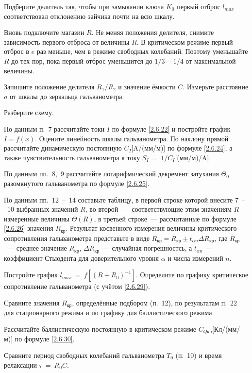 \begin{lab:task}
Подберите делитель так, чтобы при замыкании ключа
$K_0$ первый отброс $l_{max}$ соответствовал отклонению
зайчика почти на всю шкалу.

	\item Вновь подключите магазин $R$. Не меняя положения делителя,
снимите зависимость первого отброса от величины $R$. В критическом
режиме первый отброс в $e$ раз меньше, чем в режиме свободных
колебаний. Поэтому уменьшайте $R$ до тех пор, пока первый отброс
уменьшится до $1/3-1/4$ от максимальной величины.

	\item Запишите положение делителя
$R_1/R_2$ и значение ёмкости
$C$. Измерьте расстояние $a$ от шкалы до зеркальца
гальванометра.

	\item Разберите схему.


	\item По данным п.~7 рассчитайте токи $I$ по формуле \eqref{2.6.22} и постройте
график $I=f(x)$. Оцените линейность шкалы гальванометра. По наклону
прямой рассчитайте динамическую постоянную $C_I$[A/(мм/м)] по формуле
\eqref{2.6.24}, а также чувствительность гальванометра к току $S_I~=~1/C_I$[(мм/м)/A].

	\item По данным пп.~8,~9 рассчитайте логарифмический декремент затухания $\Theta_0$
разомкнутого гальванометра по формуле \eqref{2.6.25}.

	\item По данным пп.~12~--~14 составьте таблицу, в первой строке которой
внесите 7~--~10 выбранных значений $R$, во второй~---~соответствующие
этим значениям $R$ измеренные величины $\Theta(R)$, в третьей строке~--- 
рассчитанные по формуле \eqref{2.6.26} значения $R_{\text{кр}}$. Результат косвенного 
измерения величины критического сопротивления гальванометра представьте в 
виде $R_{\text{кр}}=\overline R_{\text{кр}}\pm t_{\alpha n}\Delta R_{\text{кр}}$,
где $\overline R_{\text{кр}}$~--- среднее значение $R_{\text{кр}}$, 
$\Delta R_{\text{кр}}$~--- случайная погрешностсь, а $t_{\alpha n}$~--- коэффициент
Стьюдента для доверительного уровня $\alpha$ и числа измерений $n$.

	\item Постройте график $l_{max}~=~f \left [(R + R_0)^{-1} \right]$. Определите по графику критическое сопротивление
гальванометра (с учётом \eqref{2.6.29}).

	\item Сравните значения $R_{\text{кр}}$, определённые подбором (п.~12),
     по результатам п.~22 для стационарного режима и по графику для баллистического 
     режима.

	\item Рассчитайте баллистическую постоянную в критическом режиме 
    $C_{Q \text{кр}}$[Кл/(мм/м)] по формуле \eqref{2.6.30}.

	\item Сравните период свободных колебаний гальванометра $T_0$ (п.~10) 
    и время релаксации $\tau~=~R_0C$.
\end{lab:task}


